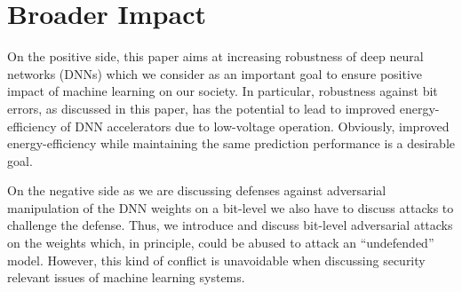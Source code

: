 \section*{Broader Impact}
On the positive side, this paper aims at increasing robustness of deep neural networks (DNNs) which we consider as an important goal to ensure positive impact of machine learning on our society. In particular, robustness against bit errors, as discussed in this paper, has the potential to lead to improved energy-efficiency of DNN accelerators due to low-voltage operation. Obviously, improved energy-efficiency while maintaining the same prediction performance is a desirable goal.

On the negative side as we are discussing defenses against adversarial manipulation of the DNN weights on a bit-level we also have to discuss attacks to challenge the defense. Thus, we introduce and discuss bit-level adversarial attacks on the weights which, in principle, could be abused to attack an ``undefended'' model. However, this kind of conflict is unavoidable when discussing security relevant issues of machine learning systems.
